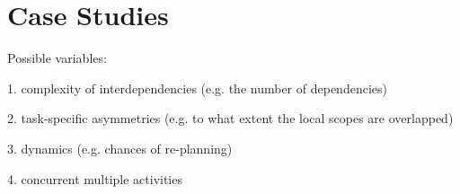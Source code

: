 \graphicspath{{Figures/}}

\chapter{Case Studies} %
\label{cha:case_studies}

Possible variables:

1. complexity of interdependencies (e.g. the number of dependencies)

2. task-specific asymmetries (e.g. to what extent the local scopes are overlapped)
 
3. dynamics (e.g. chances of re-planning)

4. concurrent multiple activities





 

